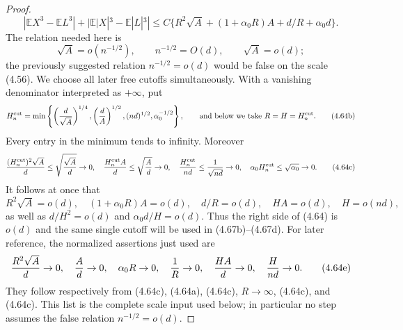 \documentclass[11pt,a4paper]{article}
\numberwithin{equation}{section}
\theoremstyle{definition}
\theoremstyle{remark}
\newcommand{\E}{\mathbb E}
\begin{document}
\begin{proof}
\[
 |\E X^3-\E L^3|+|\E|X|^3-\E|L|^3|
 \le C\{R^2\sqrt A+(1+\alpha_0R)A+d/R+\alpha_0d\}. \tag{4.64}
\]
The relation needed here is
\[
 \sqrt A=o(n^{-1/2}),\qquad n^{-1/2}=O(d),\qquad
 \sqrt A=o(d);                                         \tag{4.64a}
\]
the previously suggested relation $n^{-1/2}=o(d)$ would be false on the
scale (4.56).  We choose all later free cutoffs simultaneously.  With a vanishing
denominator interpreted as $+\infty$, put
\[
 H_n^{\rm cut}=\min\left\{
 \left({d\over\sqrt A}\right)^{1/4},
 \left({d\over A}\right)^{1/2},
 (nd)^{1/2},\alpha_0^{-1/2}\right\},
 \qquad\text{and below we take }R=H=H_n^{\rm cut}.     \tag{4.64b}
\]
Every entry in the minimum tends to infinity.  Moreover
\[
 {(H_n^{\rm cut})^2\sqrt A\over d}\le
       \sqrt{{\sqrt A\over d}}\to0,
 \quad {H_n^{\rm cut}A\over d}\le\sqrt{{A\over d}}\to0,
 \quad {H_n^{\rm cut}\over nd}\le{1\over\sqrt{nd}}\to0,
 \quad \alpha_0H_n^{\rm cut}\le\sqrt{\alpha_0}\to0.    \tag{4.64c}
\]
It follows at once that
\[
 R^2\sqrt A=o(d),\quad (1+\alpha_0R)A=o(d),\quad
 d/R=o(d),\quad HA=o(d),\quad H=o(nd),                 \tag{4.64d}
\]
as well as $d/H^2=o(d)$ and $\alpha_0d/H=o(d)$.  Thus the
right side of (4.64) is $o(d)$ and the same single cutoff will be used in
(4.67b)--(4.67d).
For later reference, the normalized assertions just used are
\[
 {R^2\sqrt A\over d}\to0,\quad {A\over d}\to0,\quad
 \alpha_0R\to0,\quad {1\over R}\to0,\quad
 {HA\over d}\to0,\quad {H\over nd}\to0.              \tag{4.64e}
\]
They follow respectively from (4.64c), (4.64a), (4.64c), $R\to\infty$,
(4.64c), and (4.64c).  This list is the complete scale input used below;
in particular no step assumes the false relation $n^{-1/2}=o(d)$.


\end{proof}
\end{document}
